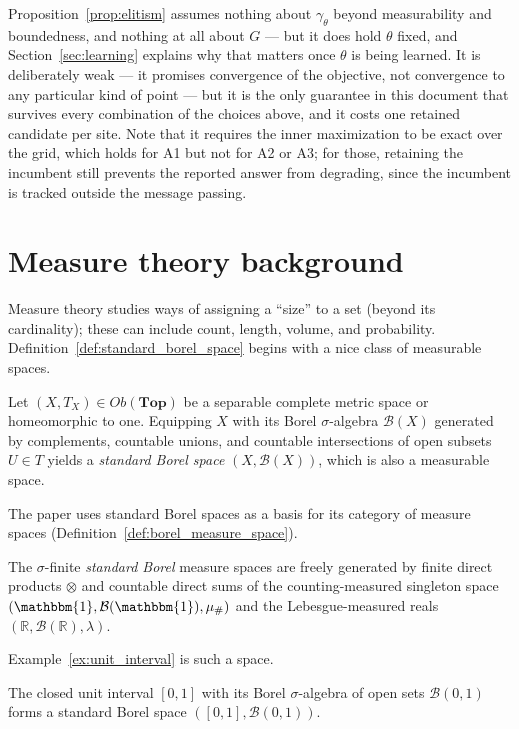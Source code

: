 Proposition~\ref{prop:elitism} assumes nothing about $\gamma_\theta$ beyond measurability and boundedness, and nothing at all about $G$ --- but it does hold $\theta$ fixed, and Section~\ref{sec:learning} explains why that matters once $\theta$ is being learned. It is deliberately weak --- it promises convergence of the objective, not convergence to any particular kind of point --- but it is the only guarantee in this document that survives every combination of the choices above, and it costs one retained candidate per site. Note that it requires the inner maximization to be exact over the grid, which holds for A1 but not for A2 or A3; for those, retaining the incumbent still prevents the reported answer from degrading, since the incumbent is tracked outside the message passing.

\section{Measure theory background}
\label{sec:measure_theory}
Measure theory studies ways of assigning a ``size'' to a set (beyond its cardinality); these can include count, length, volume, and probability. Definition~\ref{def:standard_borel_space} begins with a nice class of measurable spaces.
\begin{definition}
\label{def:standard_borel_space}
Let  $(X, T_X) \in Ob(\mathbf{Top})$ be a separable complete metric space or homeomorphic to one. Equipping $X$ with its Borel $\sigma$-algebra $\mathcal{B}(X)$ generated by complements, countable unions, and countable intersections of open subsets $U \in T$ yields a \emph{standard Borel space} $(X, \mathcal{B}(X))$, which is also a measurable space.
\end{definition}
The paper uses standard Borel spaces as a basis for its category of measure spaces (Definition~\ref{def:borel_measure_space}).
\begin{definition}
\label{def:borel_measure_space}
The $\sigma$-finite \emph{standard Borel} measure spaces are freely generated by finite direct products $\otimes$ and countable direct sums of the counting-measured singleton space $(\mathbbm{1}, \mathcal{B}(\mathbbm{1}), \mu_{\#})$ and the Lebesgue-measured reals $(\mathbb{R}, \mathcal{B}(\mathbb{R}), \lambda)$.
\end{definition}
Example~\ref{ex:unit_interval} is such a space.
\begin{example}
\label{ex:unit_interval}
The closed unit interval $[0, 1]$ with its Borel $\sigma$-algebra of open sets $\mathcal{B}(0, 1)$ forms a standard Borel space $([0, 1], \mathcal{B}(0, 1))$.
\end{example}
